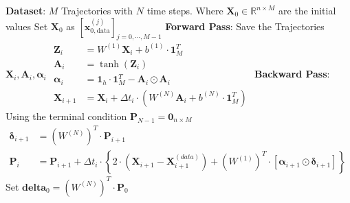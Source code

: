 \documentclass[a4paper, 12pt]{scrartcl}
\begin{document}
\begin{algorithm}\label{alg:MLP_Adjoint_full}
    \caption{Training of a MLP Neural ODE with Adjoint Approach}
    \begin{algorithmic}[1]
        \State \textbf{Dataset}: $M$ Trajectories with $N$ time steps. 
        Where $\bm{X}_0 \in \mathbb{R}^{n \times M}$ are the initial values 
        \State Set $\bm{X}_0$ as $\left[\bm{x}_{0, \text{data}}^{(j)}\right]_{j=0,\cdots , M-1} $
            \State \textbf{Forward Pass}: Save the Trajectories $\bm{X}_i, \bm{A}_i, \bm{\alpha}_i$
             
                \State             
                $\begin{aligned}%
                    \bm{Z}_i &=W^{(1)} \bm{X}_i + b^{(1)} \cdot \bm{1}_M^T
                    \\
                    \bm{A}_i &=\tanh\left(\bm{Z}_i\right)
                    \\
                    \bm{\alpha}_{i} &= \bm{1}_h \cdot \bm{1}_M^T - \bm{A}_{i} \odot \bm{A}_{i} 
                    \\
                    \bm{X}_{i+1} &= \bm{X}_{i} + \Delta t_i \cdot \left(W^{(N)} \bm{A}_i + b^{(N)} \cdot \bm{1}_M^T \right)
                \end{aligned}$
            \EndFor
            \State 
            \State \textbf{Backward Pass}: Using the terminal condition $\bm{P}_{N-1} = \bm{0}_{n \times M}$ 
                \State 
                $\begin{aligned}
                    \bm{\delta}_{i+1}
                    &=
                    \left(W^{(N)}\right)^T \cdot \bm{P}_{i+1}
                    \\
                    \bm{P}_i 
                    &=
                    \bm{P}_{i+1} 
                    + \Delta t_i \cdot 
                    \left\{
                        2 \cdot \left(\bm{X}_{i+1} - \bm{X}_{i+1}^{(data)}\right)
                        +
                        \left(W^{(1)}\right)^T 
                        \cdot
                        \left[
                            \bm{\alpha}_{i+1}
                            \odot 
                            \bm{\delta}_{i+1}
                        \right]
                    \right\} 
                \end{aligned}$
            \EndFor
            \State Set $\bm{delta}_0 = \left(W^{(N)}\right)^T \cdot \bm{P}_0$

\end{algorithmic}
\end{algorithm}
\end{document}

